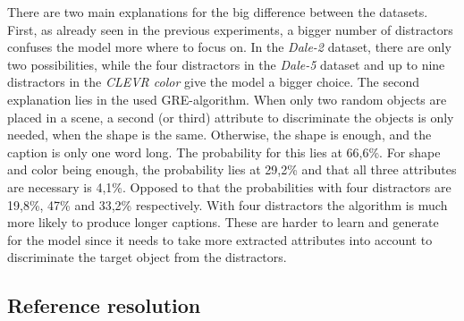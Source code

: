 There are two main explanations for the big difference between the datasets.
First, as already seen in the previous experiments, a bigger number of distractors confuses the model more where to focus on.
In the \emph{Dale-2} dataset, there are only two possibilities, while the four distractors in the \emph{Dale-5} dataset and up to nine distractors in the \emph{CLEVR color} give the model a bigger choice.
The second explanation lies in the used GRE-algorithm.
When only two random objects are placed in a scene, a second (or third) attribute to discriminate the objects is only needed, when the shape is the same.
Otherwise, the shape is enough, and the caption is only one word long.
The probability for this lies at 66,6\%.
For shape and color being enough, the probability lies at 29,2\% and that all three attributes are necessary is 4,1\%.
Opposed to that the probabilities with four distractors are 19,8\%, 47\% and 33,2\% respectively.
With four distractors the algorithm is much more likely to produce longer captions.
These are harder to learn and generate for the model since it needs to take more extracted attributes into account to discriminate the target object from the distractors.
\subsection{Reference resolution}
\label{sec:reference_resolution}
